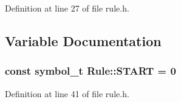 Definition at line 27 of file rule.\+h.



\subsection{Variable Documentation}
\hypertarget{namespace_rule_a99b04a06cea10219deffee01662d82e7}{
\subsubsection[{S\+T\+A\+R\+T}]{\setlength{\rightskip}{0pt plus 5cm}const {\bf symbol\+\_\+t} Rule\+::\+S\+T\+A\+R\+T = 0}}\label{namespace_rule_a99b04a06cea10219deffee01662d82e7}


Definition at line 41 of file rule.\+h.


